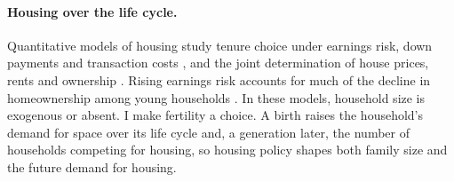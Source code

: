 \paragraph{Housing over the life cycle.}
Quantitative models of housing study tenure choice under earnings risk,
down payments and transaction costs
\citep{fisherGervaisHomeOwnership2011,halketVasudevSaving2014,boarGoreaMidriganLiquidity2022},
and the joint determination of house prices, rents and ownership
\citep{kaplanMitmanViolanteHousing2020,greenwaldGurenCredit2025}. Rising
earnings risk accounts for much of the decline in homeownership among young
households
\citep{fisherGervaisHomeOwnership2011,pazPardoHomeownership2024}. In these
models, household size is exogenous or absent. I make fertility a choice. A
birth raises the household's demand for space over its life cycle and, a
generation later, the number of households competing for housing, so
housing policy shapes both family size and the future demand for housing.
